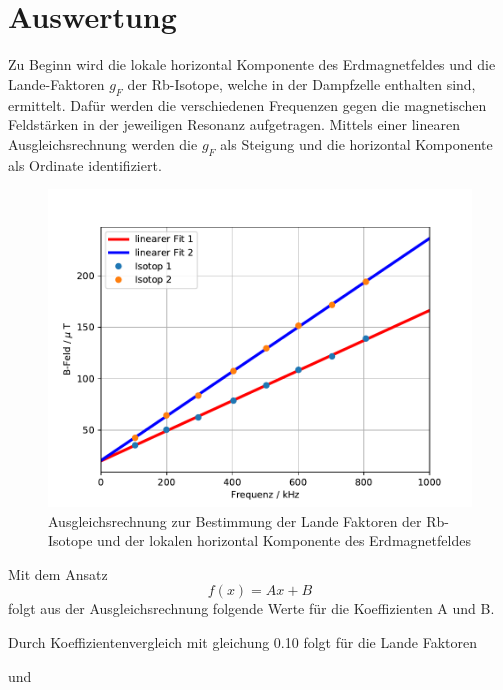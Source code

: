﻿\section{Auswertung}
Zu Beginn wird die lokale horizontal Komponente des Erdmagnetfeldes und die Lande-Faktoren $g_F$ der Rb-Isotope, welche in der Dampfzelle enthalten sind, ermittelt.
Dafür werden die verschiedenen Frequenzen gegen die magnetischen Feldstärken in der jeweiligen Resonanz aufgetragen. Mittels einer linearen Ausgleichsrechnung werden die $g_F$ als Steigung und die horizontal Komponente als Ordinate identifiziert.

\begin{figure}[h]
\centering
\includegraphics[scale=0.8]{./optischesPumpen/img/plotLande.pdf}
\caption{Ausgleichsrechnung zur Bestimmung der Lande Faktoren der Rb-Isotope und der lokalen horizontal Komponente des Erdmagnetfeldes}
\label{aufbau}
\end{figure}

Mit dem Ansatz
\begin{equation}
f(x) = Ax + B
\end{equation}
folgt aus der Ausgleichsrechnung folgende Werte für die Koeffizienten A und B.



\newpage

Durch Koeffizientenvergleich mit gleichung 0.10 folgt für die Lande Faktoren



und




